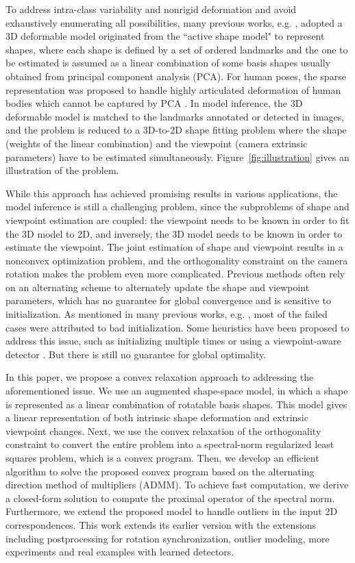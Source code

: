 \documentclass[10pt,journal,cspaper,compsoc]{IEEEtran}
\newcommand{\refFig}[1]{Figure~\ref{#1}}
\begin{document}
To address intra-class variability and nonrigid deformation and avoid exhaustively enumerating all possibilities, many previous works, e.g. \cite{hejrati2012analyzing,zia2013detailed}, adopted a 3D deformable model originated from the ``active shape model" \cite{cootes1995active} to represent shapes, where each shape is defined by a set of ordered landmarks and the one to be estimated is assumed as a linear combination of some basis shapes usually obtained from principal component analysis (PCA). For human poses, the sparse representation was proposed to handle highly articulated deformation of human bodies which cannot be captured by PCA \cite{ramakrishna2012reconstructing,wang2014robust}. In model inference, the 3D deformable model is matched to the landmarks annotated or detected in images, and the problem is reduced to a 3D-to-2D shape fitting problem where the shape (weights of the linear combination) and the viewpoint (camera extrinsic parameters) have to be estimated simultaneously. \refFig{fig:illustration} gives an illustration of the problem.

While this approach has achieved promising results in various applications, the model inference is still a challenging problem, since the subproblems of shape and viewpoint estimation are coupled: the viewpoint needs to be known in order to fit the 3D model to 2D, and inversely, the 3D model needs to be known in order to estimate the viewpoint. The joint estimation of shape and viewpoint results in a nonconvex optimization problem, and the orthogonality constraint on the camera rotation makes the problem even more complicated. Previous methods often rely on an alternating scheme to alternately update the shape and viewpoint parameters, which has no guarantee for global convergence and is sensitive to initialization. As mentioned in many previous works, e.g. \cite{ramakrishna2012reconstructing,hejrati2012analyzing}, most of the failed cases were attributed to bad initialization. Some heuristics have been proposed to address this issue, such as initializing multiple times \cite{wang2014robust} or using a viewpoint-aware detector \cite{zia2013detailed}. But there is still no guarantee for global optimality.

In this paper, we propose a convex relaxation approach to addressing the aforementioned issue. We use an augmented shape-space model, in which a shape is represented as a linear combination of rotatable basis shapes. This model gives a linear representation of both intrinsic shape deformation and extrinsic viewpoint changes. Next, we use the convex relaxation of the orthogonality constraint to convert the entire problem into a spectral-norm regularized least squares problem, which is a convex program. Then, we develop an efficient algorithm to solve the proposed convex program based on the alternating direction method of multipliers (ADMM). To achieve fast computation, we derive a closed-form solution to compute the proximal operator of the spectral norm. Furthermore, we extend the proposed model to handle outliers in the input 2D correspondences. This work extends its earlier version \cite{zhou20143d} with the extensions including postprocessing for rotation synchronization, outlier modeling, more experiments and real examples with learned detectors.
\end{document}
